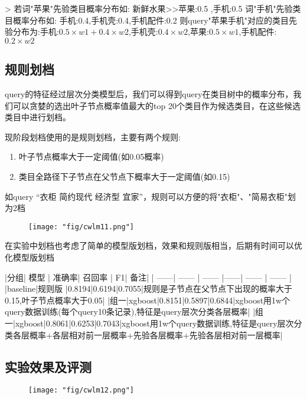 > 若词"苹果"先验类目概率分布如:  新鲜水果>>苹果:0.5 ,手机:0.5
词"手机"先验类目概率分布如: 手机:0.4,手机壳:0.4,手机配件:0.2
则query"苹果手机"对应的类目先验分布为:手机:$0.5\times w1+0.4\times w2$,手机壳:$0.4\times w2$,苹果:$0.5\times w1$,手机配件:$0.2\times w2$

\subsection{规则划档}
query的特征经过层次分类模型后，我们可以得到query在类目树中的概率分布，我们可以贪婪的选出叶子节点概率值最大的top 20个类目作为候选类目，在这些候选类目中进行划档。

\par 现阶段划档使用的是规则划档，主要有两个规则:
\begin{enumerate}
\item 叶子节点概率大于一定阈值(如0.05概率)
\item 类目全路径下子节点在父节点下概率大于一定阈值(如0.15)
\end{enumerate}

如query “衣柜 简约现代 经济型 宜家”，规则可以方便的将"衣柜"、"简易衣柜"划为2档

\begin{figure}[!h]
	\centering
	\texttt{[image: "fig/cwlm11.png"]}
	\caption{}
	\label{fig:cwlm11}
\end{figure}

在实验中划档也考虑了简单的模型版划档，效果和规则版相当，后期有时间可以优化模型版划档

|分组| 模型 | 准确率| 召回率 | F1| 备注|
| ------| ------ | ------ |------| ------ | ------ |
|baseline|规则版  |0.8194|0.6194|0.7055|规则是子节点在父节点下出现的概率大于0.15,叶子节点概率大于0.05|
|组一|xgboost|0.8151|0.5897|0.6844|xgboost用1w个query数据训练(每个query10条记录),特征是query层次分类各层概率|
|组一|xgboost|0.8061|0.6253|0.7043|xgboost用1w个query数据训练,特征是query层次分类各层概率+各层相对前一层概率+先验各层概率+先验各层相对前一层概率|

\subsection{实验效果及评测}

\begin{figure}[!h]
	\centering
	\texttt{[image: "fig/cwlm12.png"]}
	\caption{}
	\label{fig:cwlm12}
\end{figure}


